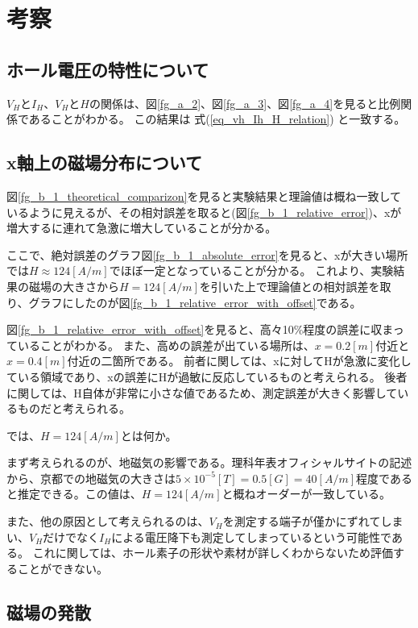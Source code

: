 \documentclass[uplatex,11pt]{jsarticle}
\newcommand{\fr}[1]{図\ref{fg_#1}}
\newcommand{\er}[1]{式(\ref{#1})}
\begin{document}
\section{考察}

\subsection{ホール電圧の特性について}

$V_H$と$I_H$、$V_H$と$H$の関係は、\fr{a_2}、\fr{a_3}、\fr{a_4}を見ると比例関係であることがわかる。
この結果は \er{eq_vh_Ih_H_relation} と一致する。

\subsection{x軸上の磁場分布について}

\fr{b_1_theoretical_comparizon}を見ると実験結果と理論値は概ね一致しているように見えるが、その相対誤差を取ると(\fr{b_1_relative_error})、xが増大するに連れて急激に増大していることが分かる。

ここで、絶対誤差のグラフ\fr{b_1_absolute_error}を見ると、xが大きい場所では$H \approx 124[A/m]$でほぼ一定となっていることが分かる。
これより、実験結果の磁場の大きさから$ H = 124[A/m] $を引いた上で理論値との相対誤差を取り、グラフにしたのが\fr{b_1_relative_error_with_offset}である。

\fr{b_1_relative_error_with_offset}を見ると、高々10\%程度の誤差に収まっていることがわかる。
また、高めの誤差が出ている場所は、$x = 0.2[m]$付近と$x = 0.4[m]$付近の二箇所である。
前者に関しては、xに対してHが急激に変化している領域であり、xの誤差にHが過敏に反応しているものと考えられる。
後者に関しては、H自体が非常に小さな値であるため、測定誤差が大きく影響しているものだと考えられる。

では、$ H = 124[A/m] $とは何か。

まず考えられるのが、地磁気の影響である。理科年表オフィシャルサイトの記述から、京都での地磁気の大きさは$5 \times 10^{-5} [T] = 0.5 [G] = 40 [A/m]$程度であると推定できる。この値は、$H = 124[A/m]$と概ねオーダーが一致している。

また、他の原因として考えられるのは、$V_H$を測定する端子が僅かにずれてしまい、$V_H$だけでなく$I_H$による電圧降下も測定してしまっているという可能性である。
これに関しては、ホール素子の形状や素材が詳しくわからないため評価することができない。

\subsection{磁場の発散}
\end{document}

